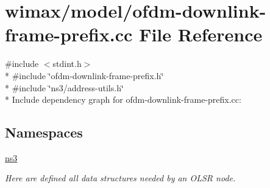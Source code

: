 \hypertarget{ofdm-downlink-frame-prefix_8cc}{}\section{wimax/model/ofdm-\/downlink-\/frame-\/prefix.cc File Reference}
\label{ofdm-downlink-frame-prefix_8cc}
{\ttfamily \#include $<$stdint.\+h$>$}\\*
{\ttfamily \#include \char`\"{}ofdm-\/downlink-\/frame-\/prefix.\+h\char`\"{}}\\*
{\ttfamily \#include \char`\"{}ns3/address-\/utils.\+h\char`\"{}}\\*
Include dependency graph for ofdm-\/downlink-\/frame-\/prefix.cc\+:
\subsection*{Namespaces}
\begin{DoxyCompactItemize}
\item 
 \hyperlink{namespacens3}{ns3}
\begin{DoxyCompactList}\small\item\em Here are defined all data structures needed by an O\+L\+SR node. \end{DoxyCompactList}\end{DoxyCompactItemize}
